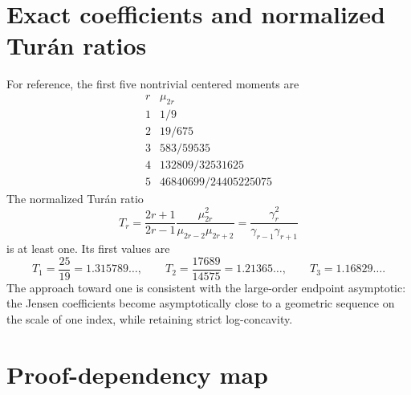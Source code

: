 \documentclass[11pt]{article}
\numberwithin{equation}{section}
\theoremstyle{definition}
\theoremstyle{remark}
\begin{document}
\appendix
\renewcommand*{\theHsection}{\arabic{part}.\arabic{section}}

\section{Exact coefficients and normalized Tur\'an ratios}

For reference, the first five nontrivial centered moments are
\begin{equation}\label{p5:eq:moment-table-display}
\begin{array}{c|c}
 r&\mu_{2r}\\
\hline
1&1/9\\
2&19/675\\
3&583/59535\\
4&132809/32531625\\
5&46840699/24405225075
\end{array}
\end{equation}
The normalized Tur\'an ratio
\begin{equation}\label{p5:eq:Turan-ratio}
 T_r=\frac{2r+1}{2r-1}
 \frac{\mu_{2r}^2}{\mu_{2r-2}\mu_{2r+2}}
 =\frac{\gamma_r^2}{\gamma_{r-1}\gamma_{r+1}}
\end{equation}
is at least one.  Its first values are
\begin{equation}\label{p5:eq:Turan-values}
 T_1=\frac{25}{19}=1.315789\ldots,
 \qquad
 T_2=\frac{17689}{14575}=1.21365\ldots,
 \qquad
 T_3=1.16829\ldots.
\end{equation}
The approach toward one is consistent with the large-order endpoint
asymptotic: the Jensen coefficients become asymptotically close to a geometric
sequence on the scale of one index, while retaining strict log-concavity.

\section{Proof-dependency map}
\end{document}
